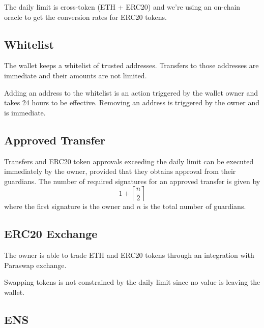 \documentclass[12pt]{article}
\begin{document}
The daily limit is cross-token (ETH + ERC20) and we're using an on-chain oracle to get the conversion rates for ERC20 tokens.

\subsection{Whitelist}
\label{sec:whitelist}

The wallet keeps a whitelist of trusted addresses. Transfers to those addresses are immediate and their amounts are not limited.

Adding an address to the whitelist is an action triggered by the wallet owner and takes 24 hours to be effective. Removing an address is triggered by the owner and is immediate.

\subsection{Approved Transfer}
\label{sec:approved-transfer}

Transfers and ERC20 token approvals exceeding the daily limit can be executed immediately by the owner, provided that they obtains approval from their guardians. The number of required signatures for an approved transfer is given by
\begin{equation*}
    1+\left\lceil {\frac{n}{2}} \right\rceil
\end{equation*}
where the first signature is the owner and $n$ is the total number of guardians.

\subsection{ERC20 Exchange}

The owner is able to trade ETH and ERC20 tokens through an integration with Paraswap exchange.

Swapping tokens is not constrained by the daily limit since no value is leaving the wallet.

\subsection{ENS}
\end{document}
